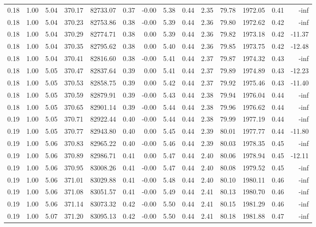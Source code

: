 \begin{table}[!ht]
\begin{tabular}{rrrrrrrrrrrrrr}
0.18 & 1.00 & 5.04 & 370.17 & 82733.07 & 0.37 & -0.00 & 5.38 & 0.44 & 2.35 & 79.78 & 1972.05 & 0.41 & -inf \\
0.18 & 1.00 & 5.04 & 370.23 & 82753.86 & 0.38 & -0.00 & 5.39 & 0.44 & 2.36 & 79.80 & 1972.62 & 0.42 & -inf \\
0.18 & 1.00 & 5.04 & 370.29 & 82774.71 & 0.38 & 0.00 & 5.39 & 0.44 & 2.36 & 79.82 & 1973.18 & 0.42 & -11.37 \\
0.18 & 1.00 & 5.04 & 370.35 & 82795.62 & 0.38 & 0.00 & 5.40 & 0.44 & 2.36 & 79.85 & 1973.75 & 0.42 & -12.48 \\
0.18 & 1.00 & 5.04 & 370.41 & 82816.60 & 0.38 & -0.00 & 5.41 & 0.44 & 2.37 & 79.87 & 1974.32 & 0.43 & -inf \\
0.18 & 1.00 & 5.05 & 370.47 & 82837.64 & 0.39 & 0.00 & 5.41 & 0.44 & 2.37 & 79.89 & 1974.89 & 0.43 & -12.23 \\
0.18 & 1.00 & 5.05 & 370.53 & 82858.75 & 0.39 & 0.00 & 5.42 & 0.44 & 2.37 & 79.92 & 1975.46 & 0.43 & -11.40 \\
0.18 & 1.00 & 5.05 & 370.59 & 82879.91 & 0.39 & -0.00 & 5.43 & 0.44 & 2.38 & 79.94 & 1976.04 & 0.44 & -inf \\
0.18 & 1.00 & 5.05 & 370.65 & 82901.14 & 0.39 & -0.00 & 5.44 & 0.44 & 2.38 & 79.96 & 1976.62 & 0.44 & -inf \\
0.19 & 1.00 & 5.05 & 370.71 & 82922.44 & 0.40 & -0.00 & 5.44 & 0.44 & 2.38 & 79.99 & 1977.19 & 0.44 & -inf \\
0.19 & 1.00 & 5.05 & 370.77 & 82943.80 & 0.40 & 0.00 & 5.45 & 0.44 & 2.39 & 80.01 & 1977.77 & 0.44 & -11.80 \\
0.19 & 1.00 & 5.06 & 370.83 & 82965.22 & 0.40 & -0.00 & 5.46 & 0.44 & 2.39 & 80.03 & 1978.35 & 0.45 & -inf \\
0.19 & 1.00 & 5.06 & 370.89 & 82986.71 & 0.41 & 0.00 & 5.47 & 0.44 & 2.40 & 80.06 & 1978.94 & 0.45 & -12.11 \\
0.19 & 1.00 & 5.06 & 370.95 & 83008.26 & 0.41 & -0.00 & 5.47 & 0.44 & 2.40 & 80.08 & 1979.52 & 0.45 & -inf \\
0.19 & 1.00 & 5.06 & 371.01 & 83029.88 & 0.41 & -0.00 & 5.48 & 0.44 & 2.40 & 80.10 & 1980.11 & 0.46 & -inf \\
0.19 & 1.00 & 5.06 & 371.08 & 83051.57 & 0.41 & -0.00 & 5.49 & 0.44 & 2.41 & 80.13 & 1980.70 & 0.46 & -inf \\
0.19 & 1.00 & 5.06 & 371.14 & 83073.32 & 0.42 & -0.00 & 5.50 & 0.44 & 2.41 & 80.15 & 1981.29 & 0.46 & -inf \\
0.19 & 1.00 & 5.07 & 371.20 & 83095.13 & 0.42 & -0.00 & 5.50 & 0.44 & 2.41 & 80.18 & 1981.88 & 0.47 & -inf \\

\end{tabular}
\end{table}
